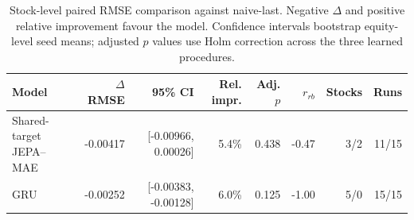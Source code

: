 \begin{table}[t]
\centering
\small
\caption{Stock-level paired RMSE comparison against naive-last. Negative $\Delta$ and positive relative improvement favour the model. Confidence intervals bootstrap equity-level seed means; adjusted $p$ values use Holm correction across the three learned procedures.}
\label{tab:paired_rmse_naive}
\begin{tabular}{lrrrrrrr}
\toprule
Model & $\Delta$RMSE & 95\% CI & Rel. impr. & Adj. $p$ & $r_{rb}$ & Stocks & Runs \\
\midrule
Shared-target JEPA--MAE & -0.00417 & [-0.00966, 0.00026] & 5.4\% & 0.438 & -0.47 & 3/2 & 11/15 \\
GRU & -0.00252 & [-0.00383, -0.00128] & 6.0\% & 0.125 & -1.00 & 5/0 & 15/15 \\
\bottomrule
\end{tabular}
\end{table}
